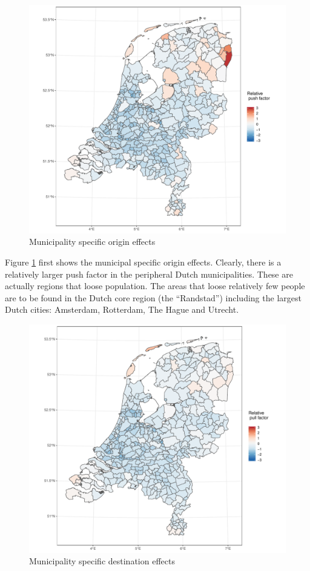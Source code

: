 \documentclass[fleqn,10pt]{SelfArx} %
\begin{document}
{{\begin{figure}
		\centering
		\includegraphics[width = \columnwidth]{../fig/p_coef_out.pdf}
		\caption{Municipality specific origin effects}\label{fig:out}
\end{figure}

Figure \ref{fig:out} first shows the municipal specific origin effects. Clearly,
there is a relatively larger push factor in the peripheral Dutch
municipalities. These are actually regions that loose population. The areas that
loose relatively few people are to be found in the Dutch core region (the
``Randstad'') including the largest Dutch cities: Amsterdam, Rotterdam, The
Hague and Utrecht.

\begin{figure}
	\centering
	\includegraphics[width = \columnwidth]{../fig/p_coef_in.pdf}
	\caption{Municipality specific destination effects}\label{fig:in}
\end{figure}

}}
\end{document}
